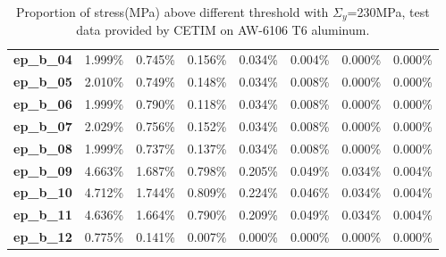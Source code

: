\begin{table}[!h]
\begin{tabular}{llllllll}
\textbf{ep\_b\_04}           & 1.999\%        & 0.745\%        & 0.156\%        & 0.034\%         & 0.004\%         & 0.000\%         & 0.000\%         \\
\textbf{ep\_b\_05}           & 2.010\%        & 0.749\%        & 0.148\%        & 0.034\%         & 0.008\%         & 0.000\%         & 0.000\%         \\
\textbf{ep\_b\_06}           & 1.999\%        & 0.790\%        & 0.118\%        & 0.034\%         & 0.008\%         & 0.000\%         & 0.000\%         \\
\textbf{ep\_b\_07}           & 2.029\%        & 0.756\%        & 0.152\%        & 0.034\%         & 0.008\%         & 0.000\%         & 0.000\%         \\
\textbf{ep\_b\_08}           & 1.999\%        & 0.737\%        & 0.137\%        & 0.034\%         & 0.008\%         & 0.000\%         & 0.000\%         \\
\textbf{ep\_b\_09}           & 4.663\%        & 1.687\%        & 0.798\%        & 0.205\%         & 0.049\%         & 0.034\%         & 0.004\%         \\
\textbf{ep\_b\_10}           & 4.712\%        & 1.744\%        & 0.809\%        & 0.224\%         & 0.046\%         & 0.034\%         & 0.004\%         \\
\textbf{ep\_b\_11}           & 4.636\%        & 1.664\%        & 0.790\%        & 0.209\%         & 0.049\%         & 0.034\%         & 0.004\%         \\
\textbf{ep\_b\_12}           & 0.775\%        & 0.141\%        & 0.007\%        & 0.000\%         & 0.000\%         & 0.000\%         & 0.000\%         \\ \hline
\end{tabular}
\caption{Proportion of stress(MPa) above different threshold with $\Sigma_y$=230MPa, test data provided by CETIM on AW-6106 T6 aluminum.}
\label{tab.majordamage}
\end{table}

